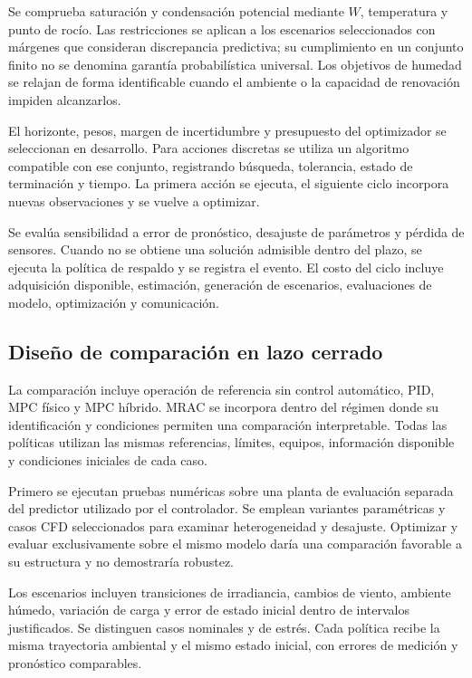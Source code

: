 Se comprueba saturación y condensación potencial mediante $W$, temperatura y punto de rocío. Las restricciones se aplican a los escenarios seleccionados con márgenes que consideran discrepancia predictiva; su cumplimiento en un conjunto finito no se denomina garantía probabilística universal. Los objetivos de humedad se relajan de forma identificable cuando el ambiente o la capacidad de renovación impiden alcanzarlos.

El horizonte, pesos, margen de incertidumbre y presupuesto del optimizador se seleccionan en desarrollo. Para acciones discretas se utiliza un algoritmo compatible con ese conjunto, registrando búsqueda, tolerancia, estado de terminación y tiempo. La primera acción se ejecuta, el siguiente ciclo incorpora nuevas observaciones y se vuelve a optimizar.

Se evalúa sensibilidad a error de pronóstico, desajuste de parámetros y pérdida de sensores. Cuando no se obtiene una solución admisible dentro del plazo, se ejecuta la política de respaldo y se registra el evento. El costo del ciclo incluye adquisición disponible, estimación, generación de escenarios, evaluaciones de modelo, optimización y comunicación.

\subsection{Diseño de comparación en lazo cerrado}
\label{met:comparacion_control}

La comparación incluye operación de referencia sin control automático, PID, MPC físico y MPC híbrido. MRAC se incorpora dentro del régimen donde su identificación y condiciones permiten una comparación interpretable. Todas las políticas utilizan las mismas referencias, límites, equipos, información disponible y condiciones iniciales de cada caso.

Primero se ejecutan pruebas numéricas sobre una planta de evaluación separada del predictor utilizado por el controlador. Se emplean variantes paramétricas y casos CFD seleccionados para examinar heterogeneidad y desajuste. Optimizar y evaluar exclusivamente sobre el mismo modelo daría una comparación favorable a su estructura y no demostraría robustez.

Los escenarios incluyen transiciones de irradiancia, cambios de viento, ambiente húmedo, variación de carga y error de estado inicial dentro de intervalos justificados. Se distinguen casos nominales y de estrés. Cada política recibe la misma trayectoria ambiental y el mismo estado inicial, con errores de medición y pronóstico comparables.

